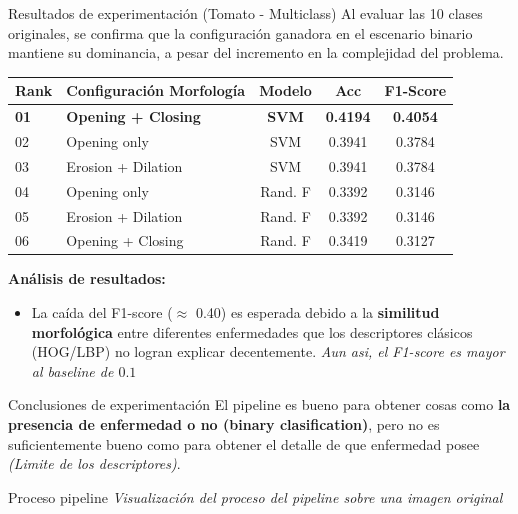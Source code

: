 \documentclass[10pt]{beamer}
\begin{document}
\begin{frame}{Resultados de experimentación (Tomato - Multiclass)}
    Al evaluar las 10 clases originales, se confirma que la configuración ganadora en el escenario binario mantiene su dominancia, a pesar del incremento en la complejidad del problema.
        
        \begin{table}[]
            \centering
            \begin{tabular}{llccc}
                \toprule
                \textbf{Rank} & \textbf{Configuración Morfología} & \textbf{Modelo} & \textbf{Acc} & \textbf{F1-Score} \\
                \midrule
                \textbf{01} & \textbf{Opening + Closing} & \textbf{SVM} & \textbf{0.4194} & \textbf{0.4054} \\
                02 & Opening only & SVM & 0.3941 & 0.3784 \\
                03 & Erosion + Dilation & SVM & 0.3941 & 0.3784 \\
                04 & Opening only & Rand. F & 0.3392 & 0.3146 \\
                05 & Erosion + Dilation & Rand. F & 0.3392 & 0.3146 \\
                06 & Opening + Closing & Rand. F & 0.3419 & 0.3127 \\
                \bottomrule
            \end{tabular}
        \end{table}
        
        \textbf{Análisis de resultados:} 
        \begin{itemize}
            \item La caída del F1-score ($\approx$ 0.40) es esperada debido a la \textbf{similitud morfológica} entre diferentes enfermedades que los descriptores clásicos (HOG/LBP) no logran explicar decentemente. \textit{Aun asi, el F1-score es mayor al baseline de $0.1$}
        \end{itemize}
\end{frame}

\begin{frame}{Conclusiones de experimentación}
   El pipeline es bueno para obtener cosas como \textbf{la presencia de enfermedad o no (binary clasification)}, pero no es suficientemente bueno como para obtener el detalle de que enfermedad posee \textit{(Limite de los descriptores)}.
\end{frame}

\begin{frame}{Proceso pipeline}
    \centering \textit{Visualización del proceso del pipeline sobre una imagen original}
\end{frame}
\end{document}
